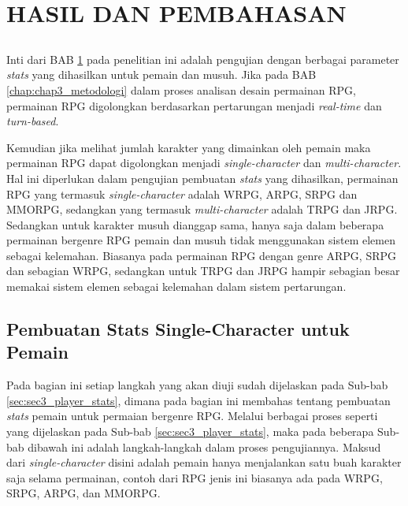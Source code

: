 \chapter{HASIL DAN PEMBAHASAN}
\label{chap:chap4_eval}
\vspace{1ex}


\section*{}
Inti dari BAB \ref{chap:chap4_eval} pada penelitian ini adalah pengujian dengan berbagai parameter \textit{stats} yang dihasilkan untuk pemain dan musuh. Jika pada BAB \ref{chap:chap3_metodologi} dalam proses analisan desain permainan RPG, permainan RPG digolongkan berdasarkan pertarungan menjadi \textit{real-time} dan \textit{turn-based}.
\vspace{1ex}

Kemudian jika melihat jumlah karakter yang dimainkan oleh pemain maka permainan RPG dapat digolongkan menjadi \textit{single-character} dan \textit{multi-character}. Hal ini diperlukan dalam pengujian pembuatan \textit{stats} yang dihasilkan, permainan RPG yang termasuk \textit{single-character} adalah WRPG, ARPG, SRPG dan MMORPG, sedangkan yang termasuk \textit{multi-character} adalah TRPG dan JRPG. Sedangkan untuk karakter musuh dianggap sama, hanya saja dalam beberapa permainan bergenre RPG pemain dan musuh tidak menggunakan sistem elemen sebagai kelemahan. Biasanya pada permainan RPG dengan genre ARPG, SRPG dan sebagian WRPG, sedangkan untuk TRPG dan JRPG hampir sebagian besar memakai sistem elemen sebagai kelemahan dalam sistem pertarungan.
\vspace{1ex}

\section{Pembuatan Stats Single-Character untuk Pemain}
\label{sec:sec4_eval_single-character_player}
\vspace{1ex}

Pada bagian ini setiap langkah yang akan diuji sudah dijelaskan pada Sub-bab \ref{sec:sec3_player_stats}, dimana pada bagian ini membahas tentang pembuatan \textit{stats} pemain untuk permaian bergenre RPG. Melalui berbagai proses seperti yang dijelaskan pada Sub-bab \ref{sec:sec3_player_stats}, maka pada beberapa Sub-bab dibawah ini adalah langkah-langkah dalam proses pengujiannya. Maksud dari \textit{single-character} disini adalah pemain hanya menjalankan satu buah karakter saja selama permainan, contoh dari RPG jenis ini biasanya ada pada WRPG, SRPG, ARPG, dan MMORPG.
\vspace{1ex}

